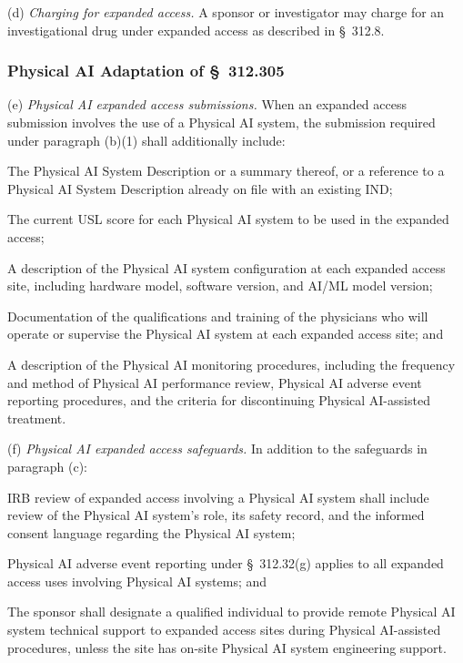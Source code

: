 (d) \textit{Charging for expanded access.} A sponsor or investigator may charge for an investigational drug under expanded access as described in \S~312.8.

\subsubsection{Physical AI Adaptation of \S~312.305}

(e) \textit{Physical AI expanded access submissions.} When an expanded access submission involves the use of a Physical AI system, the submission required under paragraph (b)(1) shall additionally include:

\begin{description}[leftmargin=0.8cm,style=sameline]
\item[(i)] The Physical AI System Description or a summary thereof, or a reference to a Physical AI System Description already on file with an existing IND;
\item[(ii)] The current USL score for each Physical AI system to be used in the expanded access;
\item[(iii)] A description of the Physical AI system configuration at each expanded access site, including hardware model, software version, and AI/ML model version;
\item[(iv)] Documentation of the qualifications and training of the physicians who will operate or supervise the Physical AI system at each expanded access site; and
\item[(v)] A description of the Physical AI monitoring procedures, including the frequency and method of Physical AI performance review, Physical AI adverse event reporting procedures, and the criteria for discontinuing Physical AI-assisted treatment.
\end{description}

(f) \textit{Physical AI expanded access safeguards.} In addition to the safeguards in paragraph (c):

\begin{description}[leftmargin=0.8cm,style=sameline]
\item[(i)] IRB review of expanded access involving a Physical AI system shall include review of the Physical AI system's role, its safety record, and the informed consent language regarding the Physical AI system;
\item[(ii)] Physical AI adverse event reporting under \S~312.32(g) applies to all expanded access uses involving Physical AI systems; and
\item[(iii)] The sponsor shall designate a qualified individual to provide remote Physical AI system technical support to expanded access sites during Physical AI-assisted procedures, unless the site has on-site Physical AI system engineering support.
\end{description}

